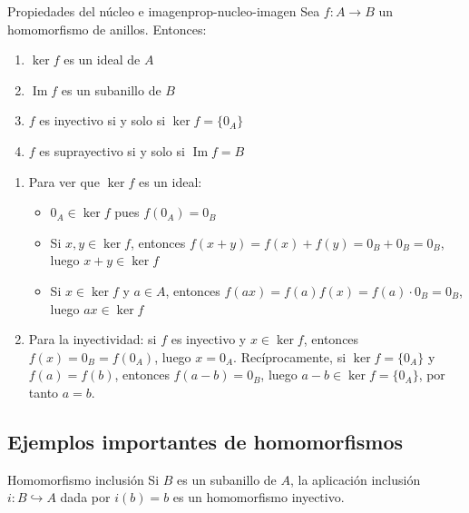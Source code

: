 \begin{proposition}{Propiedades del núcleo e imagen}{prop-nucleo-imagen}
    Sea \(f: A \to B\) un homomorfismo de anillos. Entonces:
    \begin{enumerate}
        \item \(\ker f\) es un ideal de \(A\)
        \item \(\operatorname{Im} f\) es un subanillo de \(B\)
        \item \(f\) es inyectivo si y solo si \(\ker f = \{0_A\}\)
        \item \(f\) es suprayectivo si y solo si \(\operatorname{Im} f = B\)
    \end{enumerate}
\end{proposition}

\begin{proofbox}
    \begin{enumerate}
        \item Para ver que \(\ker f\) es un ideal:
        \begin{itemize}
            \item \(0_A \in \ker f\) pues \(f(0_A) = 0_B\)
            \item Si \(x, y \in \ker f\), entonces \(f(x + y) = f(x) + f(y) = 0_B + 0_B = 0_B\), luego \(x + y \in \ker f\)
            \item Si \(x \in \ker f\) y \(a \in A\), entonces \(f(ax) = f(a)f(x) = f(a) \cdot 0_B = 0_B\), luego \(ax \in \ker f\)
        \end{itemize}
        
        \item Para la inyectividad: si \(f\) es inyectivo y \(x \in \ker f\), entonces \(f(x) = 0_B = f(0_A)\), luego \(x = 0_A\). Recíprocamente, si \(\ker f = \{0_A\}\) y \(f(a) = f(b)\), entonces \(f(a - b) = 0_B\), luego \(a - b \in \ker f = \{0_A\}\), por tanto \(a = b\).
    \end{enumerate}
\end{proofbox}

\subsection{Ejemplos importantes de homomorfismos}

\begin{example}{Homomorfismo inclusión}{}
    Si \(B\) es un subanillo de \(A\), la aplicación inclusión \(i: B \hookrightarrow A\) dada por \(i(b) = b\) es un homomorfismo inyectivo.
\end{example}

